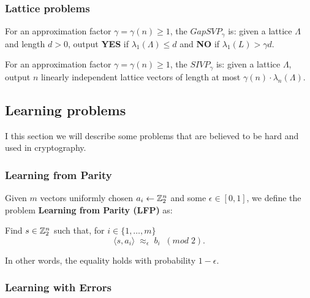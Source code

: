 \documentclass[a4paper,12pt]{article}
\begin{document}
\subsubsection{Lattice problems}
\label{sec:org55f3e6c}
    \begin{definition}
  \label{definition:GapSVP-gap-shortest-vector-problem}
For an approximation factor $\gamma  = \gamma(n) \geq 1$, the $GapSVP_\gamma $ is: given a lattice
$\Lambda$ and length $d > 0$, output \textbf{YES} if $\lambda_1(\Lambda) \leq d$ and \textbf{NO} if
$\lambda_1(L) > \gamma d$.  
\end{definition}

\begin{definition}
  \label{definition:SIVP-shortest-independent-vector-problem}
  For an approximation factor $\gamma = \gamma(n) \geq 1$, the $SIVP_\gamma$ is: given a lattice $\Lambda$, output $n$ linearly independent lattice vectors of length at most $\gamma(n) \cdot \lambda_n(\Lambda)$.
\end{definition}
\subsection{Learning problems}
\label{sec:org25b0143}
I this section we will describe some problems that are believed to be hard and used in cryptography. 
\subsubsection{Learning from Parity}
\label{sec:org68b1a9c}
\begin{definition}
  \label{definition:LFP-learning-from-parity-problem}
  Given $m$ vectors uniformly chosen  $a_i \gets \mathbb{Z}^n_2$ and some $\epsilon \in [0,1]$, we
  define the problem \textbf{Learning from Parity (LFP)} as:

  Find $s \in \mathbb{Z}^n_2$ such that, for $i \in \{1,\dots,m\}$
     $$ \langle{s, a_i}\rangle \; \approx_\epsilon \; b_i \;\; (mod\; 2). $$

     In other words, the equality holds with probability $1 - \epsilon$.

\end{definition}

\subsubsection{Learning with Errors}
\label{sec:orgb9da43d}
\end{document}
